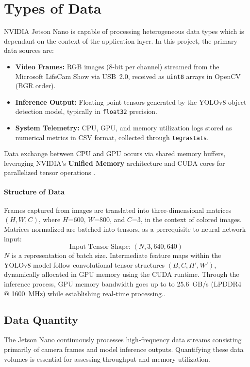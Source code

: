 \section{Types of Data}
NVIDIA Jetson Nano is capable of processing heterogeneous data types which is dependant on the context of the application layer.  
In this project, the primary data sources are:
\begin{itemize}
	\item \textbf{Video Frames:} RGB images (8-bit per channel) streamed from the Microsoft LifeCam Show via \ac{USB}~2.0, received as \texttt{uint8} arrays in OpenCV (BGR order).
	\item \textbf{Inference Output:} Floating-point tensors generated by the YOLOv8 object detection model, typically in \texttt{float32} precision.
	\item \textbf{System Telemetry:} CPU, \ac{GPU}, and memory utilization logs stored as numerical metrics in CSV format, collected through \texttt{tegrastats}.
\end{itemize}
Data exchange between CPU and \ac{GPU} occurs via shared memory buffers, leveraging NVIDIA’s \textbf{Unified Memory} architecture and CUDA cores for parallelized tensor operations \cite{jetson_nano_doc,edgeAIbook}.  

\paragraph{Structure of Data}
Frames captured from images are translated into three-dimensional matrices $(H, W, C)$, where $H$=600, $W$=800, and $C$=3, in the context of colored images.  
Matrices normalized are batched into tensors, as a prerequisite to neural network input:
\[
\text{Input Tensor Shape: } (N, 3, 640, 640)
\]
$N$ is a representation of batch size.  
Intermediate feature maps within the YOLOv8 model follow convolutional tensor structures $(B, C, H', W')$, dynamically allocated in \ac{GPU} memory using the CUDA runtime.  
Through the inference process, \ac{GPU} memory bandwidth goes up to to 25.6~GB/s (LPDDR4 @ 1600~MHz) while establishing real-time processing.\cite{jetsonNanoDatasheet}.  

\subsection{Data Quantity}
The Jetson Nano continuously processes high-frequency data streams consisting primarily of camera frames and model inference outputs.  
Quantifying these data volumes is essential for assessing throughput and memory utilization.

